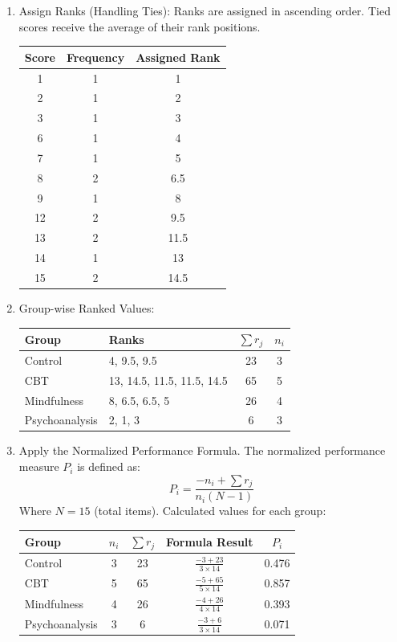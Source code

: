 \documentclass[a4paper,fleqn,review]{cas-sc}
\begin{document}
\begin{enumerate}[Step 1.]
	\item Assign Ranks (Handling Ties): Ranks are assigned in ascending order. Tied scores receive the average of their rank positions.
	\begin{center}
		\begin{tabular}{|c|c|c|}
			\hline
			\textbf{Score} & \textbf{Frequency} & \textbf{Assigned Rank} \\
			\hline
			1 & 1 & 1 \\
			2 & 1 & 2 \\
			3 & 1 & 3 \\
			6 & 1 & 4 \\
			7 & 1 & 5 \\
			8 & 2 & 6.5 \\
			9 & 1 & 8 \\
			12 & 2 & 9.5 \\
			13 & 2 & 11.5 \\
			14 & 1 & 13 \\
			15 & 2 & 14.5 \\
			\hline
		\end{tabular}
	\end{center}
	\item Group-wise Ranked Values:
	\begin{center}
		\begin{tabular}{|l|l|c|c|}
			\hline
			\textbf{Group} & \textbf{Ranks} & $\sum r_j$ & $n_i$ \\
			\hline
			Control & 4, 9.5, 9.5 & 23 & 3 \\
			CBT & 13, 14.5, 11.5, 11.5, 14.5 & 65 & 5 \\
			Mindfulness & 8, 6.5, 6.5, 5 & 26 & 4 \\
			Psychoanalysis & 2, 1, 3 & 6 & 3 \\
			\hline
		\end{tabular}
	\end{center}
	
	\item Apply the Normalized Performance Formula. The normalized performance measure $P_i$ is defined as:
	\[
	P_i = \frac{-n_i + \sum r_j}{n_i (N - 1)}
	\]
	Where $N = 15$ (total items).
	Calculated values for each group:
	\begin{center}
		\begin{tabular}{|l|c|c|c|c|}
			\hline
			\textbf{Group} & $n_i$ & $\sum r_j$ & Formula Result & $P_i$ \\
			\hline
			Control & 3 & 23 & $\frac{-3 + 23}{3 \times 14}$ & 0.476 \\
			CBT & 5 & 65 & $\frac{-5 + 65}{5 \times 14}$ & 0.857 \\
			Mindfulness & 4 & 26 & $\frac{-4 + 26}{4 \times 14}$ & 0.393 \\
			Psychoanalysis & 3 & 6 & $\frac{-3 + 6}{3 \times 14}$ & 0.071 \\
			\hline
		\end{tabular}
	\end{center}
	

\end{enumerate}
\end{document}
